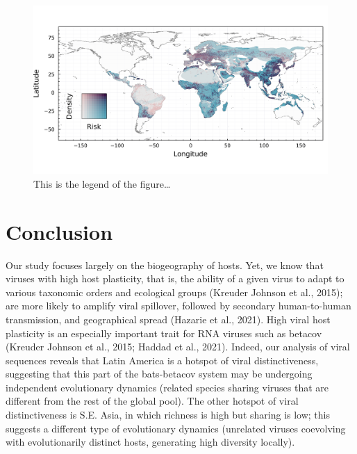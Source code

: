 \documentclass[11pt]{article}
\makeatletter
\def\maxwidth{\ifdim\Gin@nat@width>\linewidth\linewidth
\else\Gin@nat@width\fi}
\let\Oldincludegraphics\includegraphics
\renewcommand{\includegraphics}[1]{\Oldincludegraphics[width=\maxwidth]{#1}}
\makeatother
\begin{document}
\begin{figure}
\hypertarget{fig:compound}{%
\centering
\includegraphics{figures/risk_compounded.png}
\caption{This is the legend of the figure\ldots{}}\label{fig:compound}
}
\end{figure}

\hypertarget{conclusion}{%
\section{Conclusion}\label{conclusion}}

Our study focuses largely on the biogeography of hosts. Yet, we know
that viruses with high host plasticity, that is, the ability of a given
virus to adapt to various taxonomic orders and ecological groups
(Kreuder Johnson et al., 2015); are more likely to amplify viral
spillover, followed by secondary human-to-human transmission, and
geographical spread (Hazarie et al., 2021). High viral host plasticity
is an especially important trait for RNA viruses such as betacov
(Kreuder Johnson et al., 2015; Haddad et al., 2021). Indeed, our
analysis of viral sequences reveals that Latin America is a hotspot of
viral distinctiveness, suggesting that this part of the bats-betacov
system may be undergoing independent evolutionary dynamics (related
species sharing viruses that are different from the rest of the global
pool). The other hotspot of viral distinctiveness is S.E. Asia, in which
richness is high but sharing is low; this suggests a different type of
evolutionary dynamics (unrelated viruses coevolving with evolutionarily
distinct hosts, generating high diversity locally).
\end{document}
